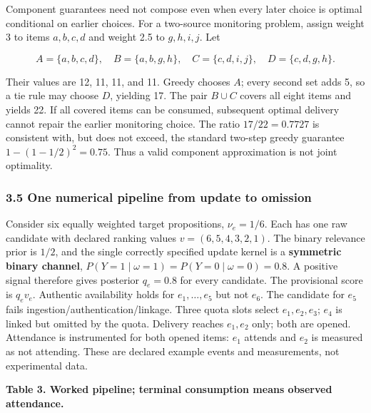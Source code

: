 \documentclass[
  11pt]{article}
\begin{document}
Component guarantees need not compose even when every later choice is
optimal conditional on earlier choices. For a two-source monitoring
problem, assign weight 3 to items \(a,b,c,d\) and weight 2.5 to
\(g,h,i,j\). Let

\[A=\{a,b,c,d\},\quad B=\{a,b,g,h\},\quad C=\{c,d,i,j\},\quad D=\{c,d,g,h\}.\]

Their values are 12, 11, 11, and 11. Greedy chooses \(A\); every second
set adds 5, so a tie rule may choose \(D\), yielding 17. The pair
\(B\cup C\) covers all eight items and yields 22. If all covered items
can be consumed, subsequent optimal delivery cannot repair the earlier
monitoring choice. The ratio \(17/22=0.7727\) is consistent with, but
does not exceed, the standard two-step greedy guarantee
\(1-(1-1/2)^2=0.75\). Thus a valid component approximation is not joint
optimality.

\subsubsection{3.5 One numerical pipeline from update to
omission}\label{one-numerical-pipeline-from-update-to-omission}

Consider six equally weighted target propositions, \(\nu_e=1/6\). Each
has one raw candidate with declared ranking values \(v=(6,5,4,3,2,1)\).
The binary relevance prior is \(1/2\), and the single correctly
specified update kernel is a \textbf{symmetric binary channel},
\(P(Y=1\mid\omega=1)=P(Y=0\mid\omega=0)=0.8\). A positive signal
therefore gives posterior \(q_e=0.8\) for every candidate. The
provisional score is \(q_ev_e\). Authentic availability holds for
\(e_1,\ldots,e_5\) but not \(e_6\). The candidate for \(e_5\) fails
ingestion/authentication/linkage. Three quota slots select
\(e_1,e_2,e_3\); \(e_4\) is linked but omitted by the quota. Delivery
reaches \(e_1,e_2\) only; both are opened. Attendance is instrumented
for both opened items: \(e_1\) attends and \(e_2\) is measured as not
attending. These are declared example events and measurements, not
experimental data.

\textbf{Table 3. Worked pipeline; terminal consumption means observed
attendance.}
\end{document}
